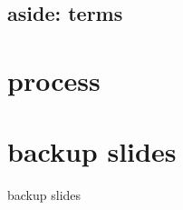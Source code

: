 \subsection{aside: terms}


\section{process}




\section{backup slides}
\begin{frame}{backup slides}
\end{frame}




